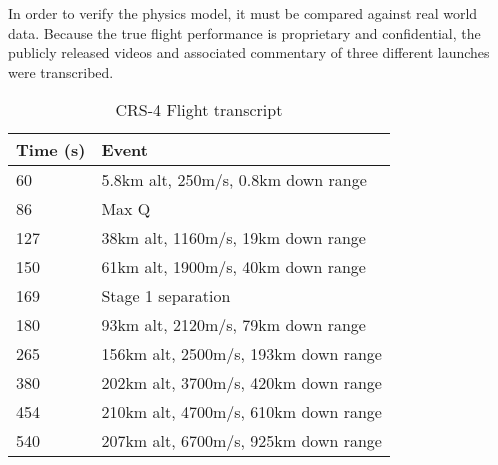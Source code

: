 In order to verify the physics model, it must be compared against real world data. Because the true flight performance is proprietary and confidential, the publicly released videos and associated commentary of three different launches were transcribed. 

\begin{table}[!htb]
\centering
\begin{tabular}{|l|l|}
\hline
\rowcolor[HTML]{C0C0C0} 
Time (s) & Event                                \\ \hline
60       & 5.8km alt, 250m/s, 0.8km down range  \\ \hline
\rowcolor[HTML]{EFEFEF} 
86       & Max Q                                \\ \hline
127      & 38km alt, 1160m/s, 19km down range   \\ \hline
\rowcolor[HTML]{EFEFEF} 
150      & 61km alt, 1900m/s, 40km down range   \\ \hline
169      & Stage 1 separation                   \\ \hline
\rowcolor[HTML]{EFEFEF} 
180      & 93km alt, 2120m/s, 79km down range   \\ \hline
265      & 156km alt, 2500m/s, 193km down range \\ \hline
\rowcolor[HTML]{EFEFEF} 
380     & 202km alt, 3700m/s, 420km down range \\ \hline
454      & 210km alt, 4700m/s, 610km down range \\ \hline
\rowcolor[HTML]{EFEFEF} 
540      & 207km alt, 6700m/s, 925km down range \\ \hline
\end{tabular}
\caption{CRS-4 Flight transcript \cite{CRS4}}
\label{tab:CRS4}
\end{table}

